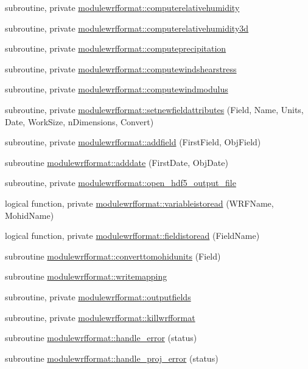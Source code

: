 \begin{DoxyCompactItemize}
subroutine, private \mbox{\hyperlink{namespacemodulewrfformat_a9cb17629d782fef1666ac25cfe816e5e}{modulewrfformat\+::computerelativehumidity}}
\item 
subroutine, private \mbox{\hyperlink{namespacemodulewrfformat_a6471c4d2451b637d8c0fbc19ec57d7f7}{modulewrfformat\+::computerelativehumidity3d}}
\item 
subroutine, private \mbox{\hyperlink{namespacemodulewrfformat_a1c8f24f66c6b703ada552c472d71569d}{modulewrfformat\+::computeprecipitation}}
\item 
subroutine, private \mbox{\hyperlink{namespacemodulewrfformat_ae1dd204b5805dcd24b48624ce696dca4}{modulewrfformat\+::computewindshearstress}}
\item 
subroutine, private \mbox{\hyperlink{namespacemodulewrfformat_a5ebdc8cdb7d4fca10d2727e8b5b542ce}{modulewrfformat\+::computewindmodulus}}
\item 
subroutine, private \mbox{\hyperlink{namespacemodulewrfformat_a2b4e995c72ac3a14b042542f4fe14c13}{modulewrfformat\+::setnewfieldattributes}} (Field, Name, Units, Date, Work\+Size, n\+Dimensions, Convert)
\item 
subroutine, private \mbox{\hyperlink{namespacemodulewrfformat_a4fec880c8102aff05f702538868fa928}{modulewrfformat\+::addfield}} (First\+Field, Obj\+Field)
\item 
subroutine \mbox{\hyperlink{namespacemodulewrfformat_a12d896f60aea7c34ec138f259778fcd0}{modulewrfformat\+::adddate}} (First\+Date, Obj\+Date)
\item 
subroutine, private \mbox{\hyperlink{namespacemodulewrfformat_a477dfcb5abd2d3fef1a7de09f09e0216}{modulewrfformat\+::open\+\_\+hdf5\+\_\+output\+\_\+file}}
\item 
logical function, private \mbox{\hyperlink{namespacemodulewrfformat_a39704adb6d59858e48b9581c11a17870}{modulewrfformat\+::variableistoread}} (W\+R\+F\+Name, Mohid\+Name)
\item 
logical function, private \mbox{\hyperlink{namespacemodulewrfformat_a3825823eb49a783934b2270b44729863}{modulewrfformat\+::fieldistoread}} (Field\+Name)
\item 
subroutine \mbox{\hyperlink{namespacemodulewrfformat_a9a0d0071658920421e26356debdbac89}{modulewrfformat\+::converttomohidunits}} (Field)
\item 
subroutine \mbox{\hyperlink{namespacemodulewrfformat_a2d9d50bc96864ebc8514152b797f5465}{modulewrfformat\+::writemapping}}
\item 
subroutine, private \mbox{\hyperlink{namespacemodulewrfformat_acba548a01d7e2ba1276dc6da267132ff}{modulewrfformat\+::outputfields}}
\item 
subroutine, private \mbox{\hyperlink{namespacemodulewrfformat_a5b240148e53caa6048e5a298bb4b0376}{modulewrfformat\+::killwrfformat}}
\item 
subroutine \mbox{\hyperlink{namespacemodulewrfformat_a00cdab997f51c9c9b8bf3a5b45ff8969}{modulewrfformat\+::handle\+\_\+error}} (status)
\item 
subroutine \mbox{\hyperlink{namespacemodulewrfformat_ae7878b44cc094aa060425acf8605dc33}{modulewrfformat\+::handle\+\_\+proj\+\_\+error}} (status)
\end{DoxyCompactItemize}
